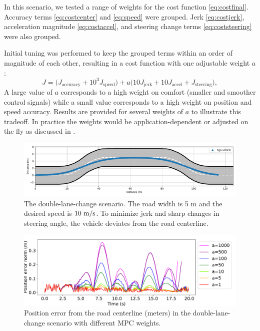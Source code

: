 \documentclass[letterpaper, 10 pt, conference]{ieeeconf}  %
\begin{document}
In this scenario, we tested a range of weights for the cost function \eqref{eq:costfinal}. Accuracy terms \eqref{eq:costcenter} and \eqref{eq:speed} were grouped. Jerk \eqref{eq:costjerk}, acceleration magnitude \eqref{eq:costaccel}, and steering change terms \eqref{eq:coststeering} were also grouped.
 
 Initial tuning was performed to keep the grouped terms within an order of magnitude of each other, resulting in a cost function with one adjustable weight $a$:
 $$J = \Big( J_{\text{accuracy}} + 10^3J_{\text{speed}} \Big) + a\Big( 10J_\text{{jerk}} + 10J_\text{{accel}} + J_{\text{steering}}\Big),$$
 A large value of $a$ corresponds to a high weight on comfort (smaller and smoother control signals) while a small value corresponds to a high weight on position and speed accuracy.
 Results are provided for several weights of $a$ to illustrate this tradeoff.
 In practice the weights would be application-dependent or adjusted on the fly as discussed in \cite{nmpc_micheli}.
 
 
 \begin{figure}[h]
 	\centering
 	\includegraphics[width=1.0\linewidth]{figures/double_lane_change.pdf}
 	\caption{The double-lane-change scenario. The road width is 5 m and the desired speed is $10\ \text{m}/\text{s}$. To minimize jerk and sharp changes in steering angle, the vehicle deviates from the road centerline.}
 	\label{fig:trajectory(lanechange)}
 \end{figure}
 
 
 \begin{figure}[h]
 	\centering
 	\includegraphics[width=1.0\linewidth]{figures/Position_error(lanechange).pdf}
 	\caption{Position error from the road centerline (meters) in the double-lane-change scenario with different MPC weights.}
 	\label{fig:error(lanechange)}
 \end{figure}
 
\end{document}
